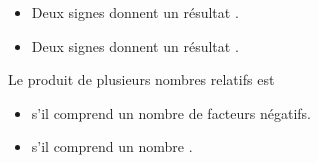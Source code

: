 \begin{attentionbox}
\begin{itemize}
    \item Deux signes  donnent un résultat .
    \item Deux signes  donnent un résultat .
\end{itemize}
\end{attentionbox}

\begin{propbox}
    Le produit de plusieurs nombres relatifs est 
    \begin{itemize}
        \item {} s'il comprend un nombre  de facteurs
            négatifs.
        \item {} s'il comprend un nombre .
    \end{itemize}
\end{propbox}
